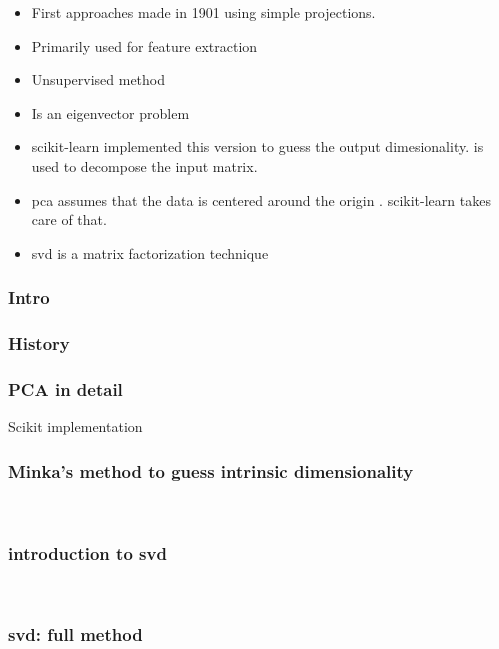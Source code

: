 \begin{itemize}
	\item First approaches made in 1901 using simple projections. \cite{pearson1901liii}
	\item Primarily used for feature extraction \cite{PythonMachineLearningCh5}
	\item Unsupervised method \cite{PythonMachineLearningCh5}
	\item Is an eigenvector problem \cite{MultilinearSubspaceLearningCh2}
	\item scikit-learn implemented this version \cite{minka2000automatic} to guess the output dimesionality. \cite{halko2009finding} is used to decompose the input matrix.
	\item \gls{pca} assumes that the data is centered around the origin \cite{HandsOnMLCh8}. scikit-learn takes care of that.
	\item \gls{svd} is a matrix factorization technique \cite{HandsOnMLCh8}
\end{itemize}


\clearpage


\subsubsection{Intro}
\clearpage

\subsubsection{History}
\clearpage

\subsubsection{PCA in detail}
Scikit implementation \cite{Tipping:2006va}
\ \clearpage
\ \clearpage
\ \clearpage
\ \clearpage

\subsubsection{Minka's method to guess intrinsic dimensionality}
\ \clearpage
\ \clearpage

\subsubsection{introduction to svd}
\ \clearpage
\ \clearpage

\subsubsection{svd: full method}
\ \clearpage
\ \clearpage

